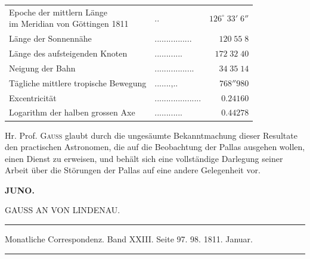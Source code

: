 \begin{center}\fontsize{10}{12}\selectfont\setlength{\tabcolsep}{4pt}\renewcommand{\arraystretch}{1.15}\begin{tabular}{llr}
\shortstack[l]{Epoche der mittlern Länge\\im Meridian von Göttingen 1811} & .\;. & $126^\circ\;33'\;6''$\\
Länge der Sonnennähe & .\;.\;.\;.\;.\;.\;.\;.\;.\;.\;.\;.\;.\;.\;.\;. & $120\;55\;8$\\
Länge des aufsteigenden Knoten & .\;.\;.\;.\;.\;.\;.\;.\;.\;.\;.\;. & $172\;32\;40$\\
Neigung der Bahn & .\;.\;.\;.\;.\;.\;.\;.\;.\;.\;.\;.\;.\;.\;.\;.\;. & $34\;35\;14$\\
Tägliche mittlere tropische Bewegung & .\;.\;.\;.\;.\;.\;.\;,\;.\;. & $768''980$\\
Excentricität & .\;.\;.\;.\;.\;.\;.\;.\;.\;.\;.\;.\;.\;.\;.\;.\;.\;.\;.\;. & $0.24160$\\
Logarithm der halben grossen Axe & .\;.\;.\;.\;.\;.\;.\;.\;.\;.\;.\;. & $0.44278$\\
\end{tabular}\end{center}

\par\indent Hr. Prof. \textsc{Gauss} glaubt durch die ungesäumte Bekanntmachung dieser Resultate den practischen Astronomen, die auf die Beobachtung der Pallas ausgehen wollen, einen Dienst zu erweisen, und behält sich eine vollständige Darlegung seiner Arbeit über die Störungen der Pallas auf eine andere Gelegenheit vor.
\clearpage
\thispagestyle{empty}
\noindent{}%
\makebox[12mm][l]{}%
\parbox[t]{\dimexpr\linewidth-24mm\relax}{\centering\footnotesize\bfseries JUNO.\par}%
\par\nobreak\medskip
\begin{center}\large GAUSS AN VON LINDENAU.\end{center}
\begin{center}\parbox{.86\linewidth}{\centering\footnotesize\frenchspacing
\hrule height .3pt\relax\vspace{2.5pt}
Monatliche Correspondenz. Band XXIII. Seite 97. 98. 1811. Januar.\par
\vspace{2.5pt}\hrule height .3pt\relax
}\end{center}

